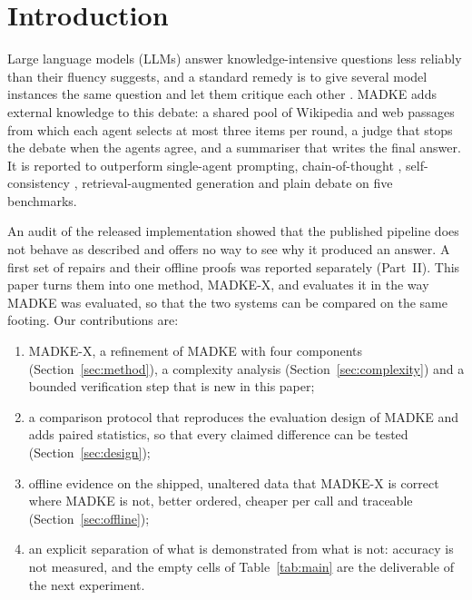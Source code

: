 \section{Introduction}
\label{sec:introduction}

Large language models (LLMs) answer knowledge-intensive questions less reliably than their fluency suggests, and a standard remedy is to give several model instances the same question and let them critique each other \cite{du2024debate,liang2024divergent,smit2024mad}. MADKE \cite{wang2025madke} adds external knowledge to this debate: a shared pool of Wikipedia and web passages from which each agent selects at most three items per round, a judge that stops the debate when the agents agree, and a summariser that writes the final answer. It is reported to outperform single-agent prompting, chain-of-thought \cite{wei2022cot}, self-consistency \cite{wang2023sc}, retrieval-augmented generation \cite{lewis2020rag} and plain debate on five benchmarks.

An audit of the released implementation \cite{ali2026audit} showed that the published pipeline does not behave as described and offers no way to see why it produced an answer. A first set of repairs and their offline proofs was reported separately (Part~II). This paper turns them into one method, MADKE-X, and evaluates it in the way MADKE was evaluated, so that the two systems can be compared on the same footing. Our contributions are:
\begin{enumerate}
\item MADKE-X, a refinement of MADKE with four components (Section~\ref{sec:method}), a complexity analysis (Section~\ref{sec:complexity}) and a bounded verification step that is new in this paper;
\item a comparison protocol that reproduces the evaluation design of MADKE and adds paired statistics, so that every claimed difference can be tested (Section~\ref{sec:design});
\item offline evidence on the shipped, unaltered data that MADKE-X is correct where MADKE is not, better ordered, cheaper per call and traceable (Section~\ref{sec:offline});
\item an explicit separation of what is demonstrated from what is not: accuracy is not measured, and the empty cells of Table~\ref{tab:main} are the deliverable of the next experiment.
\end{enumerate}

